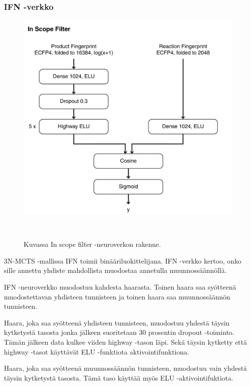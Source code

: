 \documentclass[finnish,twoside,censored,tkt,sw-line]{HYthesisML}
\begin{document}
\subsubsection{IFN -verkko}

\begin{figure}[!ht]
    \centering
    \includegraphics[]{in-scope-filter.jpg}
    \caption{Kuvassa In scope filter -neuroverkon rakenne.}
    {~\cite{SeglerMarwinHS2018Pcsw}}
    \label{fig:3n-mcts-ifn}
\end{figure}


3N-MCTS -mallissa IFN toimii binääriluokittelijana.
IFN -verkko kertoo, onko sille annettu yhdiste mahdollista muodostaa annetulla muunnossäännöllä.

IFN -neuroverkko muodostuu kahdesta haarasta.
Toinen haara saa syötteenä muodostettavan yhdisteen tunnisteen ja toinen haara saa muunnossäännön tunnisteen.

Haara, joka saa syötteenä yhdisteen tunnisteen, muodostuu yhdestä täysin kytketystä tasosta jonka jälkeen suoritetaan 30 prosentin dropout -toiminto.
Tämän jälkeen data kulkee viiden highway -tason läpi.
Sekä täysin kytketty että highway -tasot käyttävät ELU -funktiota aktivointifunktiona.

Haara, joka saa syötteenä muunnossäännön tunnisteen, muodostuu vain yhdestä täysin kytketystä tasosta.
Tämä taso käyttää myös ELU -aktivointifuktiota.
\end{document}
